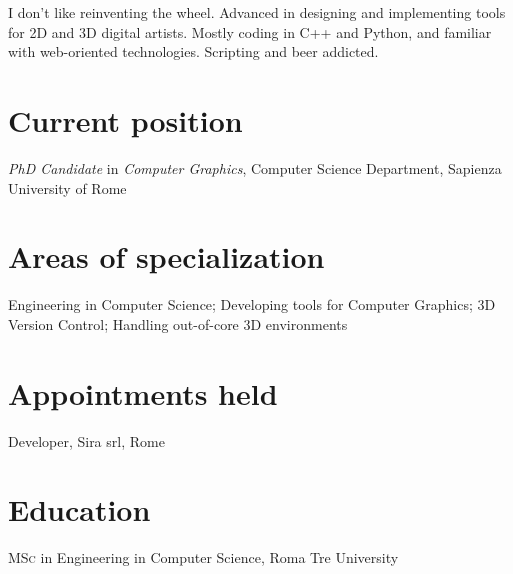 \documentclass[11pt, a4paper]{article} %
\newcommand{\years}[1]{\marginnote{\scriptsize #1}} %
\begin{document}
I don't like reinventing the wheel. Advanced in designing and implementing tools for 2D and 3D digital artists. Mostly coding in C++ and Python, and familiar with web-oriented technologies.
Scripting and beer addicted.


\section*{Current position}

\emph{PhD Candidate} in \emph{Computer Graphics}, Computer Science Department, Sapienza University of Rome %


\section*{Areas of specialization}

Engineering in Computer Science; Developing tools for Computer Graphics; 3D Version Control; Handling out-of-core 3D environments %


\section*{Appointments held}

\years{2012} Developer, Sira srl, Rome\\


\section*{Education}

\years{2016}\textsc{MSc} in Engineering in Computer Science, Roma Tre University\\

\end{document}
